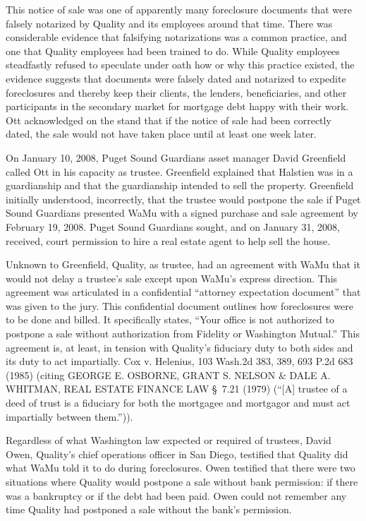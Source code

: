 This notice of sale was one of apparently many foreclosure documents
that were falsely notarized by Quality and its employees around that time.
There was considerable evidence that falsifying notarizations was a common
practice, and one that Quality employees had been trained to do. While Quality
employees steadfastly refused to speculate under oath how or why this practice
existed, the evidence suggests that documents were falsely dated and notarized
to expedite foreclosures and thereby keep their clients, the lenders,
beneficiaries, and other participants in the secondary market for mortgage debt
happy with their work. Ott acknowledged on the stand that if the notice of sale
had been correctly dated, the sale would not have taken place until at least
one week later.

On January 10, 2008, Puget Sound Guardians asset manager David
Greenfield called Ott in his capacity as trustee. Greenfield explained that
Halstien was in a guardianship and that the guardianship intended to sell the
property. Greenfield initially understood, incorrectly, that the trustee would
postpone the sale if Puget Sound Guardians presented WaMu with a signed
purchase and sale agreement by February 19, 2008. Puget Sound Guardians sought,
and on January 31, 2008, received, court permission to hire a real estate agent
to help sell the house.

Unknown to Greenfield, Quality, as trustee, had an agreement with WaMu
that it would not delay a trustee's sale except upon WaMu's express direction.
This agreement was articulated in a confidential ``attorney expectation
document'' that was given to the jury. This confidential document outlines how
foreclosures were to be done and billed. It specifically states, ``Your office
is not authorized to postpone a sale without authorization from Fidelity or
Washington Mutual.'' This agreement is, at least, in tension with Quality's
fiduciary duty to both sides and its duty to act impartially. Cox v. Helenius,
103 Wash.2d 383, 389, 693 P.2d 683 (1985) (citing GEORGE E. OSBORNE, GRANT S.
NELSON \& DALE A. WHITMAN, REAL ESTATE FINANCE LAW \S~7.21 (1979) (``[A]
trustee of a deed of trust is a fiduciary for both the mortgagee and mortgagor
and must act impartially between them.'')).

Regardless of what Washington law expected or required of trustees,
David Owen, Quality's chief operations officer in San Diego, testified that
Quality did what WaMu told it to do during foreclosures. Owen testified that
there were two situations where Quality would postpone a sale without bank
permission: if there was a bankruptcy or if the debt had been paid. Owen could
not remember any time Quality had postponed a sale without the bank's
permission.

